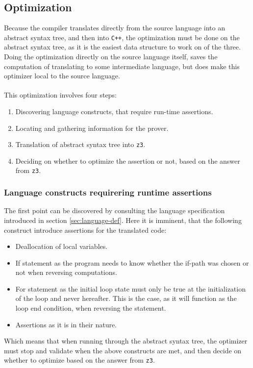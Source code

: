 \subsection{Optimization }
Because the compiler translates directly from the source language into an abstract syntax tree,
and then into \texttt{C++}, the optimization must be done on the abstract syntax tree, as it is
the easiest data structure to work on of the three. Doing the optimization directly on the source
language itself, saves the computation of translating to some intermediate language, but does
make this optimizer local to the source language.
\\
\\
This optimization involves four steps:
\begin{enumerate}
    \item Discovering language constructs, that require run-time assertions.
    \item Locating and gathering information for the prover.
    \item Translation of abstract syntax tree into \texttt{z3}.
    \item Deciding on whether to optimize the assertion or not, based on the answer
          from \texttt{z3}.
\end{enumerate}

\subsubsection{Language constructs requirering runtime assertions }
The first point can be discovered by consulting the language specification introduced
in section \ref{sec:language-def}. Here it is imminent, that the following construct introduce
assertions for the translated code:
\begin{itemize} %
    \item Deallocation of local variables.
    \item If statement as the program needs to know whether the if-path was chosen or not when
          reversing computations.

    \item For statement as the initial loop state must only be true at the initialization of the
          loop and never hereafter. This is the case, as it will function as the loop end
          condition, when reversing the statement.

    \item Assertions as it is in their nature.
\end{itemize}
\noindent
Which means that when running through the abstract syntax tree, the optimizer must stop and validate
when the above constructs are met, and then decide on whether to optimize based on the answer from
\texttt{z3}.

